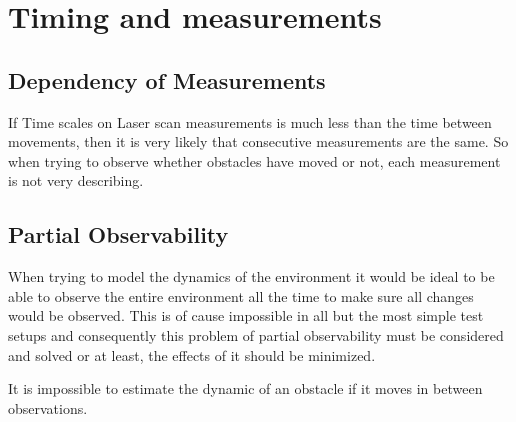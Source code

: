 \section{Timing and measurements}

\subsection{Dependency of Measurements}
If Time scales on Laser scan measurements is much less than the time between movements, then it is very likely that consecutive measurements are the same. So when trying to observe whether obstacles have moved or not, each measurement is not very describing.
\subsection{Partial Observability}
When trying to model the dynamics of the environment it would be ideal to be able to observe the entire environment all the time to make sure all changes would be observed. This is of cause impossible in all but the most simple test setups and consequently this problem of partial observability must be considered and solved or at least, the effects of it should be minimized.

It is impossible to estimate the dynamic of an obstacle if it moves in between observations.
